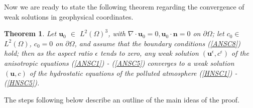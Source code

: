 \documentclass[11pt]{article}
\newtheorem{theorem}{Theorem}
\begin{document}
Now we are ready to state the following theorem regarding the convergence of weak solutions in geophysical coordinates.
  
\begin{theorem} \label{maintheorem}
  Let $\mathbf{u}_0$ $\in$ $L^2 (\Omega)^3$, with $\nabla \cdot \mathbf{u}_0 = 0, \mathbf{u}_0 \cdot \mathbf{n} = 0$ on $\partial \Omega$; let $c_0 \in$ $L^2 (\Omega)$, $c_0 = 0$ on $ \partial \Omega$, and assume that the boundary conditions (\ref{ANSC8}) hold; then as the aspect ratio $\epsilon$ tends to zero, any weak solution $(\mathbf{u}^\epsilon, c^\epsilon)$ of the anisotropic equations (\ref{ANSC1}) - (\ref{ANSC5}) converges to a weak solution $(\mathbf{u}, c)$ of the hydrostatic equations of the polluted atmosphere (\ref{HNSC1}) - (\ref{HNSC5}).
\end{theorem}

The steps following below describe an outline of the main ideas of the proof.
\end{document}
